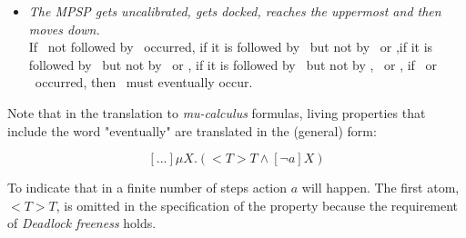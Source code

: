 \begin{itemize}
\begin{itemize}
        \item \textit{The MPSP gets uncalibrated, gets docked, reaches the uppermost and then moves down.}\\
        If \resetStandardHeight\ not followed by \setStandardHeight\ occurred, if it is followed by \dock\ but not by \undock\ or \setStandardHeight,if it is followed by \uppermostReached\  but not by \undock\ or \setStandardHeight, if it is followed by \motorDown\ but not by \setStandardHeight, \uppermostReached\ or \emergencyMode, if \pressUp\ or \pressDown\ occurred, then \motorUp\ must eventually occur.

    \end{itemize}

\end{itemize}

Note that in the translation to \emph{mu-calculus} formulas, living properties that include the word "eventually" are translated in the (general) form:

$$
[...] \mu X . (<T>T \wedge [\neg a]X)
$$

To indicate that in a finite number of steps action $a$ will happen.
The first atom, $<T>T$, is omitted in the specification of the property because the requirement of \emph{Deadlock freeness} holds.